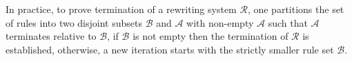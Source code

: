 In practice, to prove termination of a rewriting system $\mathcal{R}$, one partitions the set of rules into two disjoint subsets \( \mathcal{B} \) and \( \mathcal{A} \) with non-empty $\mathcal{A}$ such that \( \mathcal{A} \) terminates relative to \( \mathcal{B} \), if $\mathcal{B}$ is not empty then the termination of $\mathcal{R}$ is established, otherwise, a new iteration starts with the strictly smaller rule set $\mathcal{B}$.
